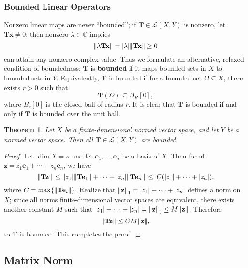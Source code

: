 \documentclass[11pt]{article}
\newtheorem{theorem}{Theorem}
\renewcommand{\vec}[1]{\mathbf{#1}}
\newcommand{\mat}[1]{\mathbf{#1}}
\begin{document}
\subsubsection*{Bounded Linear Operators}

Nonzero linear maps are never ``bounded''; if $\mat{T} \in \mathcal{L}(X, Y)$ is nonzero, let $\mat{T} \vec{x} \ne 0$; then nonzero $\lambda \in \mathbb{C}$ implies
\[
  \norm{\lambda \mat{T}\vec{x}} = \abs{\lambda} \norm{\mat{T} \vec{x}} \ge 0
\]
can attain any nonzero complex value. Thus we formulate an alternative, relaxed condition of boundedness: $\mat{T}$ is \textbf{bounded} if it maps bounded sets in $X$ to bounded sets in $Y$. Equivalently, $\mat{T}$ is bounded if for a bounded set $\Omega \subseteq X$, there exists $r > 0$ such that
\[
  \mat{T}(\Omega) \subseteq B_{R}[0],
\]
where $B_{r}[0]$ is the closed ball of radius $r$. It is clear that $\mat{T}$ is bounded if and only if $\mat{T}$ is bounded over the unit ball.

\begin{adjustwidth}{0.5cm}{}
  \begin{theorem}
    Let $X$ be a finite-dimensional normed vector space, and let $Y$ be a normed vector space. Then all $\mat{T} \in \mathcal{L}(X, Y)$ are bounded.
  \end{theorem}  
  \begin{proof}
    Let $\dim X = n$ and let $\vec{e}_{1}, \ldots, \vec{e}_{n}$ be a basis of $X$. Then for all $\vec{z} = z_{1} \vec{e}_{1} + \cdots + z_{n} \vec{e}_{n}$, we have
    \[
      \norm{\mat{T} \vec{z}} \, \le \,  \abs{z_{1}} \norm{\mat{T} \vec{e}_{1}} + \cdots + \abs{z_{n}} \norm{\mat{T} \vec{e}_{n}} \, \le \, C (\abs{z_{1}} + \cdots + \abs{z_{n}}),
    \]
    where $C = \max \{ \norm{\mat{T} \vec{e}_{i}} \}$. Realize that $\norm{\vec{z}}_{1} = \abs{z_{1}} + \cdots + \abs{z_{n}}$ defines a norm on $X$; since all norms finite-dimensional vector spaces are equivalent, there exists another constant $M$ such that $\abs{z_{1}} + \cdots + \abs{z_{n}} = \norm{\vec{z}}_{1} \le M \norm{\vec{z}}$. Therefore
    \[
      \norm{\mat{T} \vec{z}} \le CM \norm{\vec{z}},
    \]
    so $\mat{T}$ is bounded. This completes the proof.
  \end{proof}
\end{adjustwidth}

\subsection{Matrix Norm}
\end{document}
